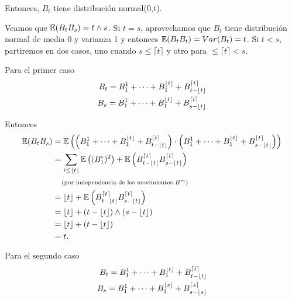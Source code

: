 Entonces, $B_t$ tiene distribución normal(0,t).\pn

Veamos que $\mathbb{E}(B_t B_s) = t \wedge s$. Si $t = s$, aprovechamos que $B_t$ tiene distribución normal de media 0 y varianza 1 y entonces
$\mathbb{E}(B_t B_t) = Var(B_t) = t$. Si $t < s$, partiremos en dos casos, uno cuando $s \leq \lceil t \rceil$ y otro para $\leq \lceil t \rceil < s$.\pn

Para el primer caso
\begin{align}
        B_t =   B^1_1+\cdots+B^{\lfloor t\rfloor}_1+B^{\lceil t \rceil}_{t-\lfloor t\rfloor}   \\
        B_s =   B^1_1+\cdots+B^{\lfloor t\rfloor}_1+B^{\lceil t \rceil}_{s-\lfloor t\rfloor}
\end{align}\pn

Entonces
\begin{align}
        \mathbb{E}(B_t B_s) &=  \mathbb{E}\left(\left(B^1_1+\cdots+B^{\lfloor t\rfloor}_1+B^{\lceil t \rceil}_{t-\lfloor t\rfloor}\right) \cdot \left(B^1_1+\cdots+B^{\lfloor t\rfloor}_1+B^{\lceil t \rceil}_{s-\lfloor t\rfloor}\right)\right)  \\
                    &=  \sum_{i \leq \lfloor t\rfloor} \mathbb{E}\left( (B_1^i)^2 \right) + \mathbb{E}\left( B^{\lceil t \rceil}_{t-\lfloor t\rfloor} B^{\lceil t \rceil}_{s-\lfloor t\rfloor}\right)                                      \\
                    &\;\;\;\;\mbox{{\scriptsize(por independencia de los movimientos $B^m$)}}                                                                                                               \\
                    &=  \lfloor t\rfloor + \mathbb{E}\left( B^{\lceil t \rceil}_{t-\lfloor t\rfloor} B^{\lceil t \rceil}_{s-\lfloor t\rfloor}\right)                                                                               \\
                    &=  \lfloor t\rfloor + (t-\lfloor t\rfloor) \wedge (s-\lfloor t\rfloor)                                                                                                                  \\
                    &=  \lfloor t\rfloor + (t-\lfloor t\rfloor)                                                                                                                                       \\
                    &=  t.                                                                                                                                                          
\end{align}\pn

Para el segundo caso
\begin{align}
        B_t =   B^1_1+\cdots+B^{\lfloor t\rfloor}_1+B^{\lceil t \rceil}_{t-\lfloor t\rfloor}   \\
        B_s =   B^1_1+\cdots+B^{\lfloor s\rfloor}_1+B^{\lceil s \rceil}_{s-\lfloor s\rfloor}
\end{align}

